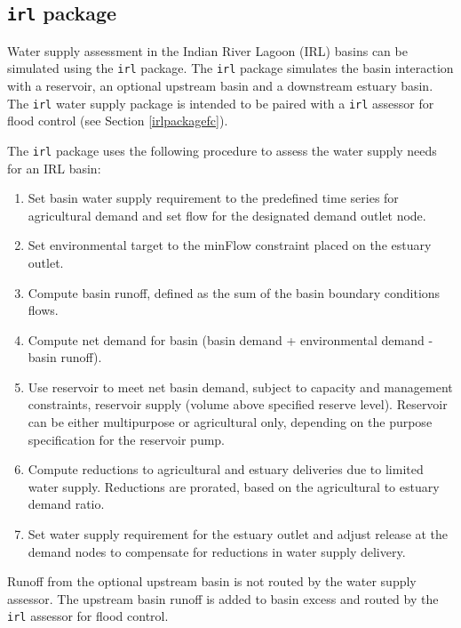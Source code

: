 \subsection{{\tt irl} package } \label{irlpackagews}

Water supply assessment in the Indian River Lagoon (IRL) basins can be
simulated using the {\tt irl} package.  The {\tt irl} package
simulates the basin interaction with a reservoir, an optional upstream
basin and a downstream estuary basin.  The {\tt irl} water supply
package is intended to be paired with a {\tt irl} assessor for flood
control (see Section \ref{irlpackagefc}).

The {\tt irl} package uses the following procedure to assess the water
supply needs for an IRL basin:

\begin{enumerate}

 \item Set basin water supply requirement to the predefined time
   series for agricultural demand and set flow for the designated
   demand outlet node.

 \item Set environmental target to the minFlow constraint placed on
   the estuary outlet.

 \item Compute basin runoff, defined as the sum of the basin boundary
   conditions flows.

 \item Compute net demand for basin (basin demand + environmental
   demand - basin runoff).

 \item Use reservoir to meet net basin demand, subject to capacity and
   management constraints, reservoir supply (volume above specified
   reserve level). Reservoir can be either multipurpose or
   agricultural only, depending on the purpose specification for the
   reservoir pump.

 \item Compute reductions to agricultural and estuary deliveries due
   to limited water supply.  Reductions are prorated, based on the
   agricultural to estuary demand ratio.

 \item Set water supply requirement for the estuary outlet and adjust
   release at the demand nodes to compensate for reductions in water
   supply delivery.

\end{enumerate}

Runoff from the optional upstream basin is not routed by the water
supply assessor.  The upstream basin runoff is added to basin excess
and routed by the {\tt irl} assessor for flood control.  


